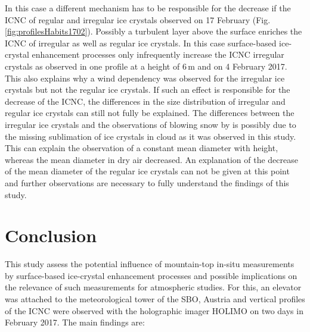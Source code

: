 \documentclass[draft,linenumbers]{agujournal}
\begin{document}
In this case a different mechanism has to be responsible for the decrease if the ICNC of regular and irregular ice crystals observed on 17 February (Fig. \ref{fig:profilesHabits1702}).  Possibly a turbulent layer above the surface enriches the ICNC of irregular as well as regular ice crystals. In this case surface-based ice-crystal enhancement processes only infrequently increase the ICNC irregular crystals as observed in one profile at a height of 6\,\si{m} and on 4 February 2017. This also explains why a wind dependency was observed for the irregular ice crystals but not the regular ice crystals. If such an effect is responsible for the decrease of the ICNC, the differences in the size distribution of irregular and regular ice crystals can still not fully be explained. The differences between the irregular ice crystals and the observations of blowing snow by \citet{Nis05} is possibly due to the missing sublimation of ice crystals in cloud as it was observed in this study. This can explain the observation of a constant mean diameter with height, whereas the mean diameter in dry air decreased. An explanation of the decrease of the mean diameter of the regular ice crystals can not be given at this point and further observations are necessary to fully understand the findings of this study.


\section{Conclusion}
This study assess the potential influence of mountain-top in-situ measurements by surface-based ice-crystal enhancement processes and possible implications on the relevance of such measurements for atmospheric studies. For this, an elevator was attached to the meteorological tower of the SBO, Austria and vertical profiles of the ICNC were observed with the holographic imager HOLIMO on two days in February 2017. The main findings are:
\end{document}
